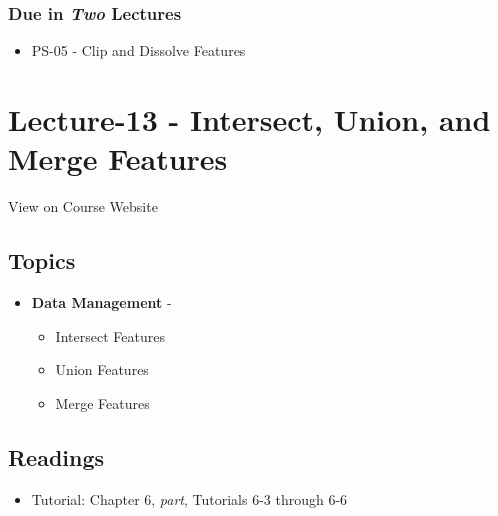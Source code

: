 \documentclass[]{book}
\providecommand{\tightlist}{%
  \setlength{\itemsep}{0pt}\setlength{\parskip}{0pt}}
\begin{document}
\hypertarget{due-in-two-lectures-6}{%
\subsubsection*{\texorpdfstring{Due in \emph{Two} Lectures}{Due in Two Lectures}}\label{due-in-two-lectures-6}}

\begin{itemize}
\tightlist
\item
  PS-05 - Clip and Dissolve Features
\end{itemize}

\hypertarget{lecture-13---intersect-union-and-merge-features}{%
\section*{Lecture-13 - Intersect, Union, and Merge Features}\label{lecture-13---intersect-union-and-merge-features}}

View on Course Website

\hypertarget{topics-13}{%
\subsection*{Topics}\label{topics-13}}

\begin{itemize}
\tightlist
\item
  \textbf{Data Management} -

  \begin{itemize}
  \tightlist
  \item
    Intersect Features
  \item
    Union Features
  \item
    Merge Features
  \end{itemize}
\end{itemize}

\hypertarget{readings-13}{%
\subsection*{Readings}\label{readings-13}}

\begin{itemize}
\tightlist
\item
  Tutorial: Chapter 6, \emph{part}, Tutorials 6-3 through 6-6
\end{itemize}
\end{document}
